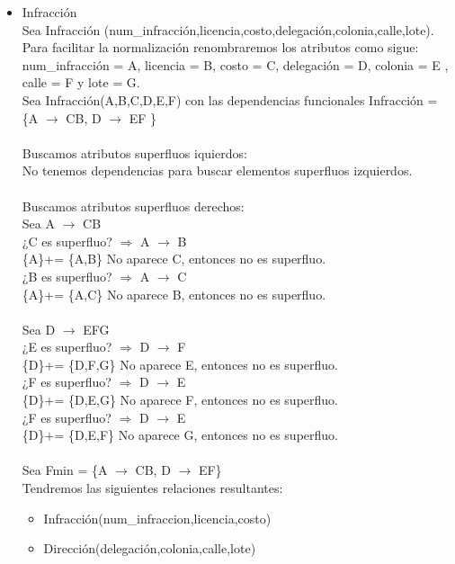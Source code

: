 \documentclass{article}
\begin{document}
\begin{itemize}
\item 
Infracción\\ Sea Infracción (num\_infracción,licencia,costo,delegación,colonia,calle,lote).\\
Para facilitar la normalización renombraremos los atributos como sigue:
num\_infracción = A, licencia = B, costo = C, delegación = D, colonia = E , calle = F y lote = G.\\
Sea Infracción(A,B,C,D,E,F) con las dependencias funcionales 
Infracción = \{A $\rightarrow$ CB, D $\rightarrow$ EF \} \\
\\
Buscamos atributos superfluos iquierdos:\\
No tenemos dependencias para buscar elementos superfluos izquierdos.\\
\\
Buscamos atributos superfluos derechos:\\
Sea A $\rightarrow$ CB \\
¿C es superfluo? $\Rightarrow$ A $\rightarrow$ B \\
\{A\}+= \{A,B\} No aparece C, entonces no es superfluo.\\
¿B es superfluo? $\Rightarrow$ A $\rightarrow$ C \\
\{A\}+= \{A,C\} No aparece B, entonces no es superfluo.\\
\\
Sea D $\rightarrow$ EFG\\
¿E es superfluo? $\Rightarrow$ D $\rightarrow$ F \\
\{D\}+= \{D,F,G\} No aparece E, entonces no es superfluo.\\
¿F es superfluo? $\Rightarrow$ D $\rightarrow$ E \\
\{D\}+= \{D,E,G\} No aparece F, entonces no es superfluo.\\
¿F es superfluo? $\Rightarrow$ D $\rightarrow$ E \\
\{D\}+= \{D,E,F\} No aparece G, entonces no es superfluo.\\
\\
Sea Fmin = \{A $\rightarrow$ CB, D $\rightarrow$ EF\}\\
Tendremos las siguientes relaciones resultantes:
\begin{itemize}
\item Infracción(num\_infraccion,licencia,costo)
\item Dirección(delegación,colonia,calle,lote)
\end{itemize}


\end{itemize}
\end{document}
